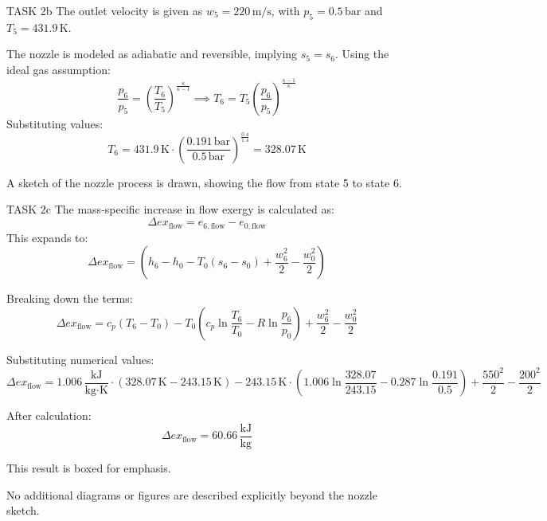 TASK 2b  
The outlet velocity is given as \( w_5 = 220 \, \text{m/s} \), with \( p_5 = 0.5 \, \text{bar} \) and \( T_5 = 431.9 \, \text{K} \).  

The nozzle is modeled as adiabatic and reversible, implying \( s_5 = s_6 \). Using the ideal gas assumption:  
\[
\frac{p_6}{p_5} = \left( \frac{T_6}{T_5} \right)^{\frac{\kappa}{\kappa - 1}} \implies T_6 = T_5 \left( \frac{p_6}{p_5} \right)^{\frac{\kappa - 1}{\kappa}}
\]  
Substituting values:  
\[
T_6 = 431.9 \, \text{K} \cdot \left( \frac{0.191 \, \text{bar}}{0.5 \, \text{bar}} \right)^{\frac{0.4}{1.4}} = 328.07 \, \text{K}
\]  

A sketch of the nozzle process is drawn, showing the flow from state 5 to state 6.  

TASK 2c  
The mass-specific increase in flow exergy is calculated as:  
\[
\Delta ex_{\text{flow}} = e_{6,\text{flow}} - e_{0,\text{flow}}
\]  
This expands to:  
\[
\Delta ex_{\text{flow}} = \left( h_6 - h_0 - T_0 (s_6 - s_0) + \frac{w_6^2}{2} - \frac{w_0^2}{2} \right)
\]  

Breaking down the terms:  
\[
\Delta ex_{\text{flow}} = c_p (T_6 - T_0) - T_0 \left( c_p \ln \frac{T_6}{T_0} - R \ln \frac{p_6}{p_0} \right) + \frac{w_6^2}{2} - \frac{w_0^2}{2}
\]  

Substituting numerical values:  
\[
\Delta ex_{\text{flow}} = 1.006 \, \frac{\text{kJ}}{\text{kg·K}} \cdot (328.07 \, \text{K} - 243.15 \, \text{K}) - 243.15 \, \text{K} \cdot \left( 1.006 \ln \frac{328.07}{243.15} - 0.287 \ln \frac{0.191}{0.5} \right) + \frac{550^2}{2} - \frac{200^2}{2}
\]  

After calculation:  
\[
\Delta ex_{\text{flow}} = 60.66 \, \frac{\text{kJ}}{\text{kg}}
\]  

This result is boxed for emphasis.  

No additional diagrams or figures are described explicitly beyond the nozzle sketch.